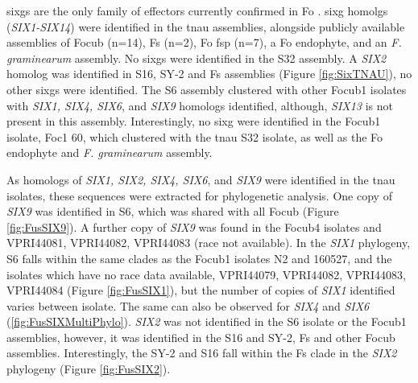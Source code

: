 \Acp{sixg} are the only family of effectors currently confirmed in \ac{Fo} \parencite{Armitage2018, Czislowski2018}. \Ac{sixg} homolgs (\textit{SIX1-SIX14}) were identified in the \ac{tnau} assemblies, alongside publicly available assemblies of \ac{Focub} (n=14), \ac{Fs} (n=2), \ac{Fo} \ac{fsp} (n=7), a \ac{Fo} endophyte, and an \textit{F. graminearum} assembly. No \acp{sixg} were identified in the S32 assembly. A \textit{SIX2} homolog was identified in S16,  SY-2  and  \ac{Fs} assemblies (Figure \ref{fig:SixTNAU}), no other \acp{sixg} were identified. The S6 assembly clustered with other \ac{Focub1} isolates with \textit{SIX1, SIX4, SIX6}, and \textit{SIX9} homologs identified, although, \textit{SIX13} is not present in this assembly. Interestingly, no \ac{sixg} were identified in the \ac{Focub1} isolate, Foc1 60, which clustered with the \ac{tnau} S32 isolate, as well as the \ac{Fo} endophyte and \textit{F. graminearum} assembly. 

As homologs of \textit{SIX1, SIX2, SIX4, SIX6}, and \textit{SIX9} were identified in the \ac{tnau} isolates, these sequences were extracted for phylogenetic analysis.  One copy of \textit{SIX9} was identified in S6, which was shared with all \ac{Focub} (Figure \ref{fig:FusSIX9}). A further copy of \textit{SIX9} was found in the \ac{Focub4} isolates and VPRI44081, VPRI44082, VPRI44083 (race not available). In the \textit{SIX1} phylogeny, S6 falls within the same clades as the \ac{Focub1} isolates N2 and 160527, and the isolates which have no race data available, VPRI44079, VPRI44082, VPRI44083, VPRI44084 (Figure \ref{fig:FusSIX1}), but the number of copies of \textit{SIX1} identified varies between isolate. The same can also be observed for \textit{SIX4} and \textit{SIX6} (\ref{fig:FusSIXMultiPhylo}). \textit{SIX2} was not identified in the S6 isolate or the \ac{Focub1} assemblies, however, it was identified in the S16 and SY-2, \ac{Fs} and other \ac{Focub} assemblies. Interestingly, the SY-2 and S16 fall within the \ac{Fs} clade in the \textit{SIX2} phylogeny (Figure \ref{fig:FusSIX2}).

